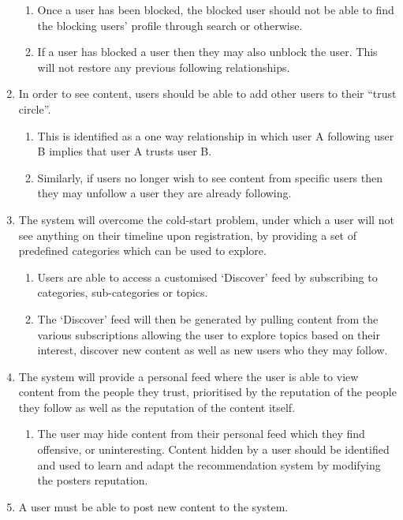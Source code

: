 \begin{enumerate}[label=\textbf{F\arabic*}]
\begin{enumerate}
			\item Once a user has been blocked, the blocked user should not be able to find the blocking users' profile through search or otherwise.
			\item If a user has blocked a user then they may also unblock the user. This will not restore any previous following relationships.
		\end{enumerate}
	\item In order to see content, users should be able to add other users to their ``trust circle''.
		\begin{enumerate}
			\item This is identified as a one way relationship in which user A following user B implies that user A trusts user B.
			\item Similarly, if users no longer wish to see content from specific users then they may unfollow a user they are already following.
		\end{enumerate}
	\item The system will overcome the cold-start problem, under which a user will not see anything on their timeline upon registration, by providing a set of predefined categories which can be used to explore.
		\begin{enumerate}
			\item Users are able to access a customised `Discover' feed by subscribing to categories, sub-categories or topics.
			\item The `Discover' feed will then be generated by pulling content from the various subscriptions allowing the user to explore topics based on their interest, discover new content as well as new users who they may follow.
		\end{enumerate}
	\item The system will provide a personal feed where the user is able to view content from the people they trust, prioritised by the reputation of the people they follow as well as the reputation of the content itself.
		\begin{enumerate}
			\item The user may hide content from their personal feed which they find offensive, or uninteresting. Content hidden by a user should be identified and used to learn and adapt the recommendation system by modifying the posters reputation.
		\end{enumerate}
	\item A user must be able to post new content to the system.
		\begin{enumerate}

\end{enumerate}
\end{enumerate}
